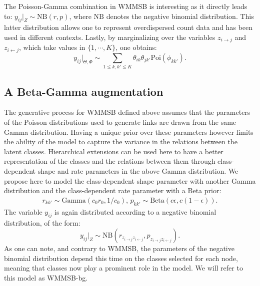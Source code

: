 The Poisson-Gamma combination in WMMSB is interesting as it directly leads to: $y_{ij}|_{Z} \sim \textrm{NB}(r,p)$, where $\textrm{NB}$ denotes the negative binomial distribution. This latter distribution allows one to represent overdispersed count data and has been used in different contexts.
Lastly, by marginalizing over the variables $z_{i \rightarrow j}$ and $z_{i \leftarrow j}$, which take values in $\{1, \cdots, K\}$, one obtains:
 \begin{equation}\label{eq:PoiCombin}
 y_{ij}|_{\Theta,\Phi} \sim \sum_{1 \le k,k' \le K} \theta_{ik} \theta_{jk'} \textrm{Poi}(\phi_{kk'}).
 \end{equation}
%

\subsection{A Beta-Gamma augmentation} 

The generative process for WMMSB defined above assumes that the parameters of the Poisson distributions used to generate links are drawn from the same Gamma distribution. Having a unique prior over these parameters however limits the ability of the model to capture the variance in the relations between the latent classes. Hierarchical extensions can be used here to have a better representation of the classes and the relations between them through class-dependent shape and rate parameters in the above Gamma distribution. We propose here to model the class-dependent shape parameter with another Gamma distribution and the class-dependent rate parameter with a Beta prior:
%
\begin{gather*}
r_{kk'} \sim \textrm{Gamma}(c_0r_0, 1/c_0), \, p_{kk'} \sim \textrm{Beta}(c\epsilon, c(1-\epsilon)).
\end{gather*}
%
The variable $y_{ij}$ is again distributed according to a negative binomial distribution, of the form:
%
\begin{equation}\label{eq:yNB}
y_{ij}|_{Z} \sim \textrm{NB}(r_{z_{i \rightarrow j} z_{i \leftarrow j}},p_{z_{i \rightarrow j} z_{i \leftarrow j}}).
\end{equation}
%
As one can note, and contrary to WMMSB, the parameters of the negative binomial distribution depend this time on the classes selected for each node, meaning that classes now play a prominent role in the model. We will refer to this model as WMMSB-bg.

